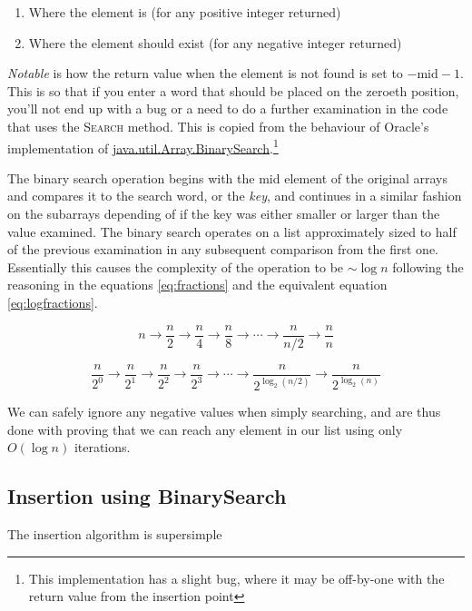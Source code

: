 \documentclass[a4paper,11pt,notitlepage]{article}
\begin{document}
\begin{enumerate}
\item Where the element is (for any positive integer returned)
\item Where the element should exist (for any negative integer returned)
\end{enumerate}

\textit{Notable} is how the return value when the element is not found is set to $-\text{mid}-1$. This is so that if you enter a word that should be placed on the zeroeth position, you'll not end up with a bug or a need to do a further examination in the code that uses the \textsc{Search} method. This is copied from the behaviour of Oracle's implementation of \href{http://docs.oracle.com/javase/7/docs/api/java/util/Arrays.html}{java.util.Array.BinarySearch}.\footnote{This implementation has a slight bug, where it may be off-by-one with the return value from the insertion point}

The binary search operation begins with the mid element of the original arrays and compares it to the search word, or the \textit{key}, and continues in a similar fashion on the subarrays depending of if the key was either smaller or larger than the value examined. The binary search operates on a list approximately sized to half of the previous examination in any subsequent comparison from the first one. Essentially this causes the complexity of the operation to be $\sim \log n$ following the reasoning in the equations \ref{eq:fractions} and the equivalent equation \ref{eq:logfractions}.

\begin{equation}\label{eq:fractions}
n \to \frac{n}{2} \to \frac{n}{4} \to \frac{n}{8} \to \cdots \to \frac{n}{n/2} \to \frac{n}{n}
\end{equation}

\begin{equation}\label{eq:logfractions}
\frac{n}{2^0} \to \frac{n}{2^1} \to \frac{n}{2^2} \to \frac{n}{2^3} \to \cdots \to \frac{n}{2^{\log_2({n/2})}} \to \frac{n}{2^{\log_2({n})}}
\end{equation}

We can safely ignore any negative values when simply searching, and are thus done with proving that we can reach any element in our list using only $O(\log n)$ iterations.

\subsection{Insertion using BinarySearch}

The insertion algorithm is supersimple
\end{document}
